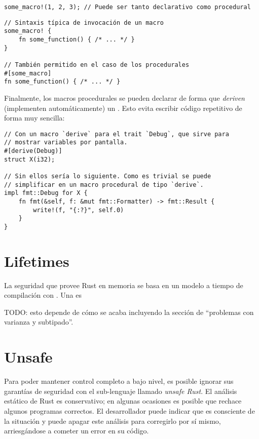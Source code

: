 \begin{verbatim}
some_macro!(1, 2, 3); // Puede ser tanto declarativo como procedural
\end{verbatim}

\begin{verbatim}
// Sintaxis típica de invocación de un macro
some_macro! {
    fn some_function() { /* ... */ }
}

// También permitido en el caso de los procedurales
#[some_macro]
fn some_function() { /* ... */ }
\end{verbatim}

Finalmente, los macros procedurales se pueden declarar de forma que
\emph{deriven} (implementen automáticamente) un \trait. Esto evita escribir
código repetitivo de forma muy sencilla:

\begin{verbatim}
// Con un macro `derive` para el trait `Debug`, que sirve para
// mostrar variables por pantalla.
#[derive(Debug)]
struct X(i32);

// Sin ellos sería lo siguiente. Como es trivial se puede
// simplificar en un macro procedural de tipo `derive`.
impl fmt::Debug for X {
    fn fmt(&self, f: &mut fmt::Formatter) -> fmt::Result {
        write!(f, "{:?}", self.0)
    }
}
\end{verbatim}

\section{Lifetimes}

La seguridad que provee Rust en memoria se basa en un modelo a tiempo de
compilación con \lifetimes. Una \lifetime es 

TODO: esto depende de cómo se acaba incluyendo la sección de ``problemas con
varianza y subtipado''.

\section{Unsafe}

Para poder mantener control completo a bajo nivel, es posible ignorar sus
garantías de seguridad con el sub-lenguaje llamado \emph{unsafe Rust}. El
análisis estático de Rust es conservativo; en algunas ocasiones es posible que
rechace algunos programas correctos. El desarrollador puede indicar que es
consciente de la situación y puede apagar este análisis para corregirlo por sí
mismo, arriesgándose a cometer un error en su código.

